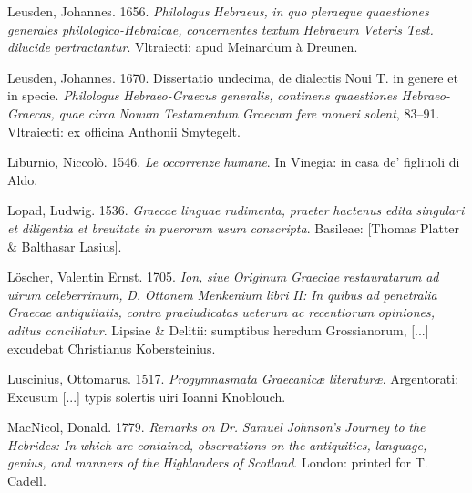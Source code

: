\documentclass[output=paper]{langsci/langscibook}
\begin{document}
Leusden, Johannes. 1656. \textit{Philologus} \textit{Hebraeus,} \textit{in} \textit{quo} \textit{pleraeque} \textit{quaestiones} \textit{generales} \textit{philologico-Hebraicae,} \textit{concernentes} \textit{textum} \textit{Hebraeum} \textit{Veteris} \textit{Test.} \textit{dilucide} \textit{pertractantur}. Vltraiecti: apud Meinardum à Dreunen.

Leusden, Johannes. 1670. Dissertatio undecima, de dialectis Noui T. in genere et in specie. \textit{Philologus} \textit{Hebraeo-Graecus} \textit{generalis,} \textit{continens} \textit{quaestiones} \textit{Hebraeo-Graecas,} \textit{quae} \textit{circa} \textit{Nouum} \textit{Testamentum} \textit{Graecum} \textit{fere} \textit{moueri} \textit{solent}, 83–91. Vltraiecti: ex officina Anthonii Smytegelt.

Liburnio, Niccolò. 1546. \textit{Le} \textit{occorrenze} \textit{humane}. In Vinegia: in casa de’ figliuoli di Aldo.

Lopad, Ludwig. 1536. \textit{Graecae} \textit{linguae} \textit{rudimenta,} \textit{praeter} \textit{hactenus} \textit{edita} \textit{singulari} \textit{et} \textit{diligentia} \textit{et} \textit{breuitate} \textit{in} \textit{puerorum} \textit{usum} \textit{conscripta}. Basileae: [Thomas Platter \& Balthasar Lasius].

Löscher, Valentin Ernst. 1705. \textit{Ion,} \textit{siue} \textit{Originum} \textit{Graeciae} \textit{restauratarum} \textit{ad} \textit{uirum} \textit{celeberrimum,} \textit{D.} \textit{Ottonem} \textit{Menkenium} \textit{libri} \textit{II:} \textit{In} \textit{quibus} \textit{ad} \textit{penetralia} \textit{Graecae} \textit{antiquitatis,} \textit{contra} \textit{praeiudicatas} \textit{ueterum} \textit{ac} \textit{recentiorum} \textit{opiniones,} \textit{aditus} \textit{conciliatur}. Lipsiae \& Delitii: sumptibus heredum Grossianorum, [...] excudebat Christianus Kobersteinius.

Luscinius, Ottomarus. 1517. \textit{Progymnasmata} \textit{Graecanicæ} \textit{literaturæ}. Argentorati: Excusum [...] typis solertis uiri Ioanni Knoblouch.

MacNicol, Donald. 1779. \textit{Remarks} \textit{on} \textit{Dr.} \textit{Samuel} \textit{Johnson’s} \textit{Journey} \textit{to} \textit{the} \textit{Hebrides:} \textit{In} \textit{which} \textit{are} \textit{contained,} \textit{observations} \textit{on} \textit{the} \textit{antiquities,} \textit{language,} \textit{genius,} \textit{and} \textit{manners} \textit{of} \textit{the} \textit{Highlanders} \textit{of} \textit{Scotland}. London: printed for T. Cadell.
\end{document}
